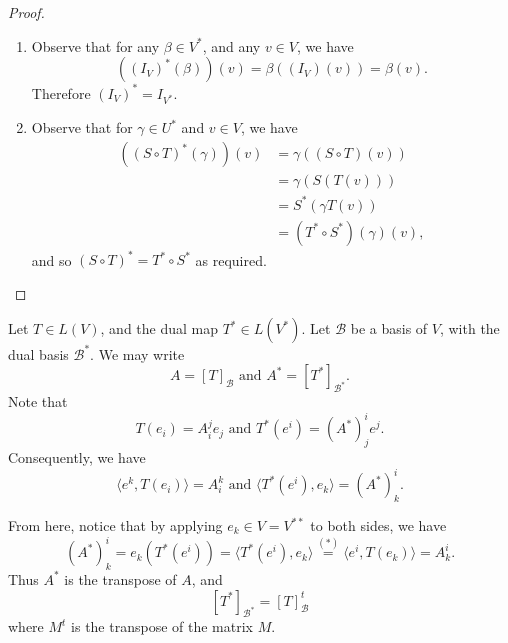 \documentclass[notoc,notitlepage]{tufte-book}
\begin{document}
\begin{proof}
  \begin{enumerate}
    \item Observe that for any $\beta \in V^*$, and any $v \in V$,
      we have
      \begin{equation*}
        ((I_V)^*(\beta))(v) = \beta((I_V)(v)) = \beta(v).
      \end{equation*}
      Therefore $(I_V)^* = I_{V^*}$.

    \item Observe that for $\gamma \in U^*$ and $v \in V$, we have
      \begin{align*}
        ((S \circ T)^*(\gamma))(v)
          &= \gamma ( ( S \circ T ) (v) ) \\
          &= \gamma ( S ( T ( v ) ) ) \\
          &= S^* ( \gamma T(v) ) \\
          &= ( T^* \circ S^* )(\gamma)(v),
      \end{align*}
      and so $( S \circ T )^* = T^* \circ S^*$ as required.
  \end{enumerate}
\end{proof}

Let $T \in L(V)$, and the dual map $T^* \in L(V^*)$.
Let $\mathcal{B}$ be a basis of $V$, with the dual basis
$\mathcal{B}^*$. We may write
\begin{equation*}
  A = [T]_{\mathcal{B}} \text{ and } A^* = [T^*]_{\mathcal{B}^*}.
\end{equation*}
Note that
\begin{equation*}
  T(e_i) = A_i^j e_j \text{ and } T^*(e^i) = (A^*)_j^i e^j.
\end{equation*}
Consequently, we have
\begin{equation*}
  \langle e^k, T( e_i ) \rangle = A_i^k \text{ and }
  \langle T^*(e^i), e_k \rangle = (A^*)_k^i.
\end{equation*}

From here, notice that by applying $e_k \in V = V^{**}$ to both sides,
we have %
\begin{equation*}
  (A^*)_k^i = e_k ( T^*(e^i) ) = \langle T^* (e^i), e_k \rangle
  \overset{(*)}{=} \langle e^i, T(e_k) \rangle = A_k^i.
\end{equation*}
Thus $A^*$ is the transpose of $A$, and
\begin{equation}\label{eq:coordinate_of_t_star_in_v_star_equals_transpose_of_coordinate_of_t_in_v}
  [ T^* ]_{\mathcal{B}^*} = [ T ]_{\mathcal{B}}^t
\end{equation}
where $M^t$ is the transpose of the matrix $M$.
\end{document}
